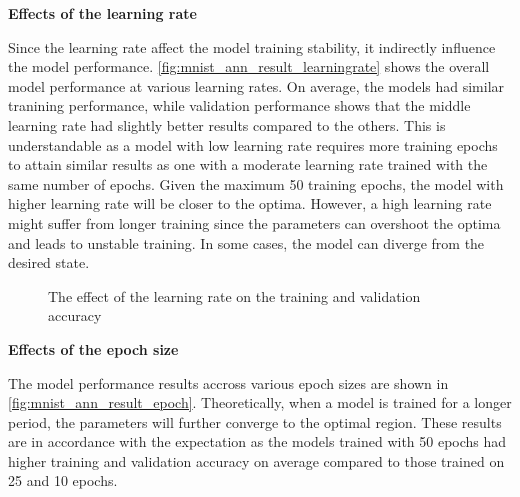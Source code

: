 \documentclass[a4paper]{article}
\begin{document}
\textbf{Effects of the learning rate}

Since the learning rate affect the model training stability, it indirectly influence the model performance. \autoref{fig:mnist_ann_result_learningrate} shows the overall model performance at various learning rates. On average, the models had similar tranining performance, while validation performance shows that the middle learning rate had slightly better results compared to the others. This is understandable as a model with low learning rate requires more training epochs to attain similar results as one with a moderate learning rate trained with the same number of epochs. Given the maximum 50 training epochs, the model with higher learning rate will be closer to the optima. However, a high learning rate might suffer from longer training since the parameters can overshoot the optima and leads to unstable training. In some cases, the model can diverge from the desired state. 
\begin{figure} [h!]
    \caption{The effect of the learning rate on the training and validation accuracy} 
    \label{fig:mnist_ann_result_learningrate}
\end{figure}

\textbf{Effects of the epoch size}

The model performance results accross various epoch sizes are shown in \autoref{fig:mnist_ann_result_epoch}. Theoretically, when a model is trained for a longer period, the parameters will further converge to the optimal region. These results are in accordance with the expectation as the models trained with 50 epochs had higher training and validation accuracy on average compared to those trained on 25 and 10 epochs. 
\end{document}

